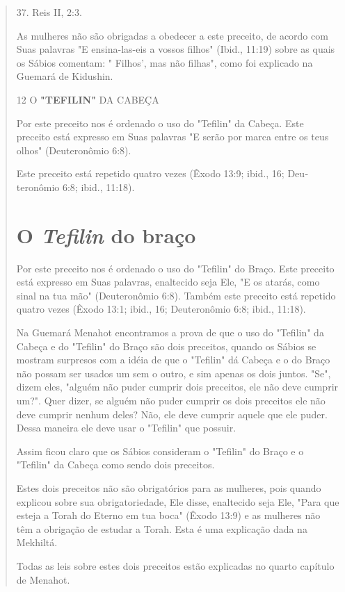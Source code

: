 \begin{quote}
37. Reis II, 2:3.



As mulheres não são obrigadas a obedecer a este preceito, de acor­do com
Suas palavras "E ensina-las-eis a vossos filhos" (Ibid., 11:19) sobre as
quais os Sábios comentam: " Filhos', mas não filhas", como foi explicado
na Guemará de Kidushin.

12 O \textbf{"TEFILIN"} DA CABEÇA

Por este preceito nos é ordenado o uso do "Tefilin" da Cabeça. Este
preceito está expresso em Suas palavras "E serão por marca entre os teus
olhos" (Deuteronômio 6:8).

Este preceito está repetido quatro vezes (Êxodo 13:9; ibid., 16;
Deu­teronômio 6:8; ibid., 11:18).

\section{O \emph{Tefilin} do braço}

Por este preceito nos é ordenado o uso do "Tefilin" do Braço. Este
preceito está expresso em Suas palavras, enaltecido seja Ele, "E os
atarás, como sinal na tua mão" (Deuteronômio 6:8). Também este preceito
está repetido qua­tro vezes (Êxodo 13:1; ibid., 16; Deuteronômio 6:8;
ibid., 11:18).

Na Guemará Menahot encontramos a prova de que o uso do "Tefi­lin" da
Cabeça e do "Tefilin" do Braço são dois preceitos, quando os Sábios se
mostram surpresos com a idéia de que o "Tefilin" dá Cabeça e o do Braço
não possam ser usados um sem o outro, e sim apenas os dois juntos. "Se",
di­zem eles, "alguém não puder cumprir dois preceitos, ele não deve
cumprir um?". Quer dizer, se alguém não puder cumprir os dois preceitos
ele não deve cum­prir nenhum deles? Não, ele deve cumprir aquele que ele
puder. Dessa maneira ele deve usar o "Tefilin" que possuir.

Assim ficou claro que os Sábios consideram o "Tefilin" do Braço e o
"Tefilin" da Cabeça como sendo dois preceitos.

Estes dois preceitos não são obrigatórios para as mulheres, pois quan­do
explicou sobre sua obrigatoriedade, Ele disse, enaltecido seja Ele,
"Para que esteja a Torah do Eterno em tua boca" (Êxodo 13:9) e as
mulheres não têm a obrigação de estudar a Torah. Esta é uma explicação
dada na Mekhiltá.

Todas as leis sobre estes dois preceitos estão explicadas no quarto
capítulo de Menahot.


\end{quote}
